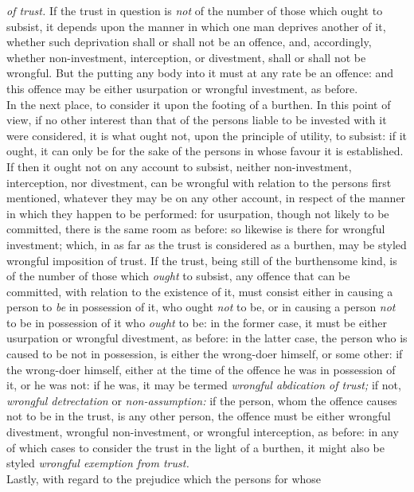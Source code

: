 \documentclass[12pt]{report}
\begin{document}
\emph{of trust.} If the trust in question is \emph{not} of the number of
those which ought to subsist, it depends upon the manner in which one
man deprives another of it, whether such deprivation shall or shall not
be an offence, and, accordingly, whether non-investment, interception,
or divestment, shall or shall not be wrongful. But the putting any body
into it must at any rate be an offence: and this offence may be either
usurpation or wrongful investment, as before.\\
In the next place, to consider it upon the footing of a burthen. In this
point of view, if no other interest than that of the persons liable to
be invested with it were considered, it is what ought not, upon the
principle of utility, to subsist: if it ought, it can only be for the
sake of the persons in whose favour it is established. If then it ought
not on any account to subsist, neither non-investment, interception, nor
divestment, can be wrongful with relation to the persons first
mentioned, whatever they may be on any other account, in respect of the
manner in which they happen to be performed: for usurpation, though not
likely to be committed, there is the same room as before: so likewise is
there for wrongful investment; which, in as far as the trust is
considered as a burthen, may be styled wrongful imposition of trust. If
the trust, being still of the burthensome kind, is of the number of
those which \emph{ought} to subsist, any offence that can be committed,
with relation to the existence of it, must consist either in causing a
person to \emph{be} in possession of it, who ought \emph{not} to be, or
in causing a person \emph{not} to be in possession of it who
\emph{ought} to be: in the former case, it must be either usurpation or
wrongful divestment, as before: in the latter case, the person who is
caused to be not in possession, is either the wrong-doer himself, or
some other: if the wrong-doer himself, either at the time of the offence
he was in possession of it, or he was not: if he was, it may be termed
\emph{wrongful abdication of trust;} if not, \emph{wrongful
detrectation} or \emph{non-assumption:} if the person, whom the offence
causes not to be in the trust, is any other person, the offence must be
either wrongful divestment, wrongful non-investment, or wrongful
interception, as before: in any of which cases to consider the trust in
the light of a burthen, it might also be styled \emph{wrongful exemption
from trust.}\\
\emph{}Lastly, with regard to the prejudice which the persons for whose
\end{document}
